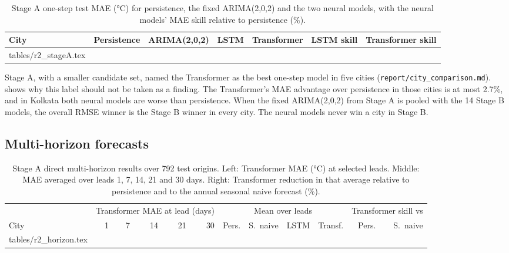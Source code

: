 \documentclass[11pt,a4paper]{article}
\makeatletter
\newcommand{\code}[1]{\texttt{#1}}
\newcommand{\tabfile}[1]{\@@input #1 }
\makeatother
\begin{document}
\begin{table}[ht]
\centering
\small
\caption{Stage A one-step test MAE (\si{\degreeCelsius}) for persistence, the fixed ARIMA(2,0,2) and the two neural models, with the neural models' MAE skill relative to persistence (\%).}
\label{tab:stageA}
\begin{tabular}{@{}l r r r r r r@{}}
\toprule
City & Persistence & ARIMA(2,0,2) & LSTM & Transformer & LSTM skill & Transformer skill \\
\midrule
\tabfile{tables/r2_stageA.tex}
\bottomrule
\end{tabular}
\end{table}

Stage A, with a smaller candidate set, named the Transformer as the best one-step model in five cities (\code{report/city\_comparison.md}).  shows why this label should not be taken as a finding. The Transformer's MAE advantage over persistence in those cities is at most 2.7\%, and in Kolkata both neural models are worse than persistence. When the fixed ARIMA(2,0,2) from Stage A is pooled with the 14 Stage B models, the overall RMSE winner is the Stage B winner in every city. The neural models never win a city in Stage B.

\subsection{Multi-horizon forecasts}
\label{sec:horizon}

\begin{table}[ht]
\centering
\footnotesize
\setlength{\tabcolsep}{3.8pt}
\caption{Stage A direct multi-horizon results over 792 test origins. Left: Transformer MAE (\si{\degreeCelsius}) at selected leads. Middle: MAE averaged over leads 1, 7, 14, 21 and 30 days. Right: Transformer reduction in that average relative to persistence and to the annual seasonal naive forecast (\%).}
\label{tab:horizon}
\begin{tabular}{@{}l rrrrr rrrr rr@{}}
\toprule
 & \multicolumn{5}{c}{Transformer MAE at lead (days)} & \multicolumn{4}{c}{Mean over leads} & \multicolumn{2}{c}{Transformer skill vs} \\
\cmidrule(lr){2-6}\cmidrule(lr){7-10}\cmidrule(l){11-12}
City & 1 & 7 & 14 & 21 & 30 & Pers. & S.\ naive & LSTM & Transf. & Pers. & S.\ naive \\
\midrule
\tabfile{tables/r2_horizon.tex}
\bottomrule
\end{tabular}
\end{table}
\end{document}
